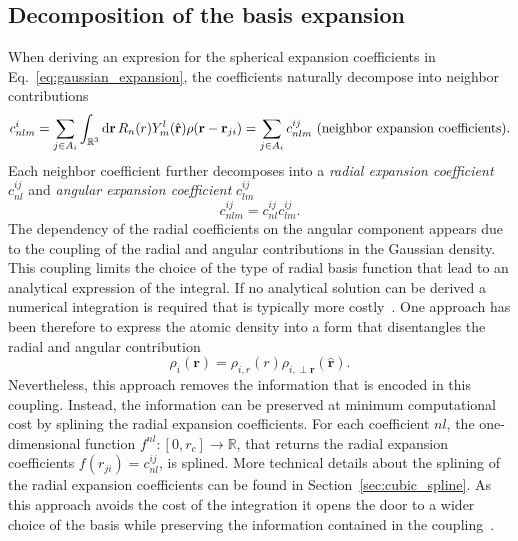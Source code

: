 \subsection{Decomposition of the basis expansion}
When deriving an expresion for the spherical expansion coefficients in Eq.~\eqref{eq:gaussian_expansion}, the coefficients naturally decompose into neighbor contributions
\begin{equation}
  \label{eq:neighbor_contr}
  c^i_{nlm} = \sum_{j\in A_i}\int_{\mathbb{R}^3}\mathrm{d}\mathbf{r}\, R_n(r)Y_m^l(\hat{\mathbf{r}})\rho(\mathbf{r}-\mathbf{r}_{ji}) = \sum_{j\in A_i}c^{ij}_{nlm} \textrm{ (neighbor expansion coefficients)}.\\
\end{equation}
Each neighbor coefficient further decomposes into a \emph{radial expansion coefficient} $c_{nl}^{ij}$ and \emph{angular expansion coefficient} $c_{lm}^{ij}$
\begin{equation}
  \label{eq:radial_expansion}
  c^{ij}_{nlm} = c_{nl}^{ij}c^{ij}_{lm}.
\end{equation}
The dependency of the radial coefficients on the angular component appears due to the coupling of the radial and angular contributions in the Gaussian density.
This coupling limits the choice of the type of radial basis function that lead to an analytical expression of the integral.
If no analytical solution can be derived a numerical integration is required that is typically more costly~\cite{musil2021efficient}.
One approach has been therefore to express the atomic density into a form that disentangles the radial and angular contribution~\cite{caro2019optimizing} 
\begin{equation}
  \rho_i(\mathbf{r}) = \rho_{i,r}(r)\rho_{i,\perp \mathbf{r}}(\hat{\mathbf{r}}).
\end{equation}
Nevertheless, this approach removes the information that is encoded in this coupling.
Instead, the information can be preserved at minimum computational cost by splining the radial expansion coefficients.
For each coefficient $nl$, the one-dimensional function $f^{nl}:[0,r_c]\rightarrow\mathbb{R}$, that returns the radial expansion coefficients $f(r_{ji}) = c_{nl}^{ij}$, is splined.
More technical details about the splining of the radial expansion coefficients can be found in Section~\ref{sec:cubic_spline}.
As this approach avoids the cost of the integration it opens the door to a wider choice of the basis while preserving the information contained in the coupling~\cite{goscinski2021optimal,bigi2022smooth,lopanitsyna2023modeling}. 

